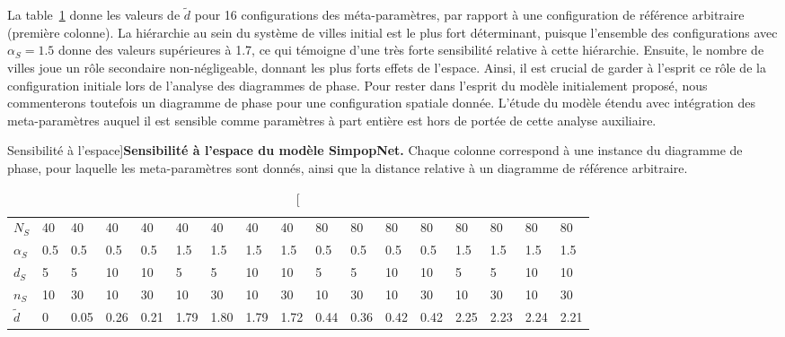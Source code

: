 La table~\ref{tab:macrocoevolexplo:spacematters} donne les valeurs de $\tilde{d}$ pour 16 configurations des méta-paramètres, par rapport à une configuration de référence arbitraire (première colonne). La hiérarchie au sein du système de villes initial est le plus fort déterminant, puisque l'ensemble des configurations avec $\alpha_S = 1.5$ donne des valeurs supérieures à 1.7, ce qui témoigne d'une très forte sensibilité relative à cette hiérarchie. Ensuite, le nombre de villes joue un rôle secondaire non-négligeable, donnant les plus forts effets de l'espace. Ainsi, il est crucial de garder à l'esprit ce rôle de la configuration initiale lors de l'analyse des diagrammes de phase. Pour rester dans l'esprit du modèle initialement proposé, nous commenterons toutefois un diagramme de phase pour une configuration spatiale donnée. L'étude du modèle étendu avec intégration des meta-paramètres auquel il est sensible comme paramètres à part entière est hors de portée de cette analyse auxiliaire. 


\begin{table}[!ht]
\caption[Sensibility to space][Sensibilité à l'espace]{}{\textbf{Sensibilité à l'espace du modèle SimpopNet.} Chaque colonne correspond à une instance du diagramme de phase, pour laquelle les meta-paramètres sont donnés, ainsi que la distance relative à un diagramme de référence arbitraire.\label{tab:macrocoevolexplo:spacematters}}
\begin{tabular}{|l|l|l|l|l|l|l|l|l|l|l|l|l|l|l|l|l|}
\hline
$N_S$ & 40 & 40 & 40 & 40 & 40 & 40 & 40 & 40 & 80 & 80 & 80 & 80 & 80 & 80 & 80 & 80\\
$\alpha_S$ & 0.5 & 0.5 & 0.5 & 0.5 & 1.5 & 1.5 & 1.5 & 1.5 & 0.5 & 0.5 & 0.5 & 0.5 & 1.5 & 1.5 & 1.5 & 1.5\\
$d_S$ & 5 & 5 & 10 & 10 & 5 & 5 & 10 & 10 & 5 & 5 & 10 & 10 & 5 & 5 & 10 & 10\\
$n_S$ & 10 & 30 & 10 & 30 & 10 & 30 & 10 & 30 & 10 & 30 & 10 & 30 & 10 & 30 & 10 & 30\\
$\tilde{d}$ & 0 & 0.05 & 0.26 & 0.21 & 1.79 & 1.80 & 1.79 & 1.72 & 0.44 & 0.36 & 0.42 & 0.42 & 2.25 & 2.23 & 2.24 & 2.21\\\hline
\end{tabular}
\end{table}




